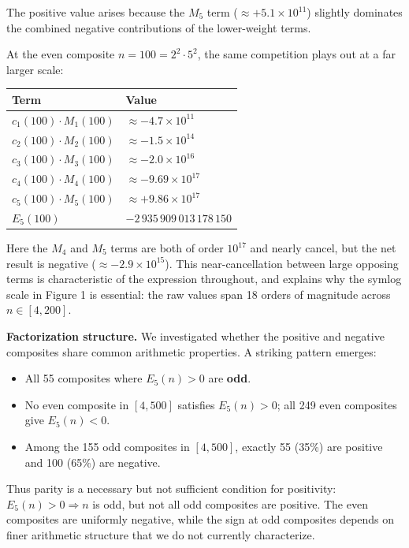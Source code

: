\documentclass[
  11pt,
]{article}
\newcounter{none} %
\providecommand{\tightlist}{%
  \setlength{\itemsep}{0pt}\setlength{\parskip}{0pt}}
\begin{document}
The positive value arises because the \(M_5\) term
(\(\approx +5.1\times10^{11}\)) slightly dominates the combined negative
contributions of the lower-weight terms.

At the even composite \(n = 100 = 2^2 \cdot 5^2\), the same competition
plays out at a far larger scale:

{\def\LTcaptype{none} %
\begin{longtable}[]{@{}ll@{}}
\toprule\noalign{}
Term & Value \\
\midrule\noalign{}
\endhead
\bottomrule\noalign{}
\endlastfoot
\(c_1(100) \cdot M_1(100)\) & \(\approx -4.7\times10^{11}\) \\
\(c_2(100) \cdot M_2(100)\) & \(\approx -1.5\times10^{14}\) \\
\(c_3(100) \cdot M_3(100)\) & \(\approx -2.0\times10^{16}\) \\
\(c_4(100) \cdot M_4(100)\) & \(\approx -9.69\times10^{17}\) \\
\(c_5(100) \cdot M_5(100)\) & \(\approx +9.86\times10^{17}\) \\
\textbf{\(E_5(100)\)} & \textbf{\(-2\,935\,909\,013\,178\,150\)} \\
\end{longtable}
}

Here the \(M_4\) and \(M_5\) terms are both of order \(10^{17}\) and
nearly cancel, but the net result is negative
(\(\approx -2.9\times10^{15}\)). This near-cancellation between large
opposing terms is characteristic of the expression throughout, and
explains why the symlog scale in Figure 1 is essential: the raw values
span 18 orders of magnitude across \(n \in [4, 200]\).

\textbf{Factorization structure.} We investigated whether the positive
and negative composites share common arithmetic properties. A striking
pattern emerges:

\begin{itemize}
\tightlist
\item
  All 55 composites where \(E_5(n) > 0\) are \textbf{odd}.
\item
  No even composite in \([4, 500]\) satisfies \(E_5(n) > 0\); all 249
  even composites give \(E_5(n) < 0\).
\item
  Among the 155 odd composites in \([4, 500]\), exactly 55 (35\%) are
  positive and 100 (65\%) are negative.
\end{itemize}

Thus parity is a necessary but not sufficient condition for positivity:
\(E_5(n) > 0 \Rightarrow n\) is odd, but not all odd composites are
positive. The even composites are uniformly negative, while the sign at
odd composites depends on finer arithmetic structure that we do not
currently characterize.
\end{document}
